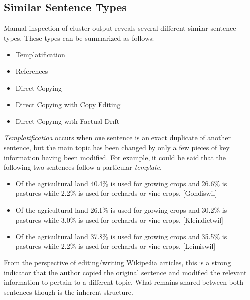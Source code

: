 \documentclass{acm_proc_article-sp}
\begin{document}
\subsection{Similar Sentence Types}

Manual inspection of cluster output reveals several different similar sentence types. These types can be summarized as follows:

\begin{itemize}
\item Templatification
\item References
\item Direct Copying
\item Direct Copying with Copy Editing
\item Direct Copying with Factual Drift
\end{itemize}

 \emph{Templatification} occurs when one sentence is an exact duplicate of another sentence, but the main topic has been changed by only a few pieces of key information having been modified. For example, it could be said that the following two sentences follow a particular \emph{template}.
\begin{itemize}[noitemsep,nolistsep]

\item Of the agricultural land 40.4\% is used for growing crops and 26.6\% is pastures while 2.2\% is used for orchards or vine crops. [Gondiswil]
\item Of the agricultural land 26.1\% is used for growing crops and 30.2\% is pastures while 3.0\% is used for orchards or vine crops. [Kleindietwil]
\item Of the agricultural land 37.8\% is used for growing crops and 35.5\% is pastures while 2.2\% is used for orchards or vine crops. [Leimiswil]

\end{itemize}
From the perspective of editing/writing Wikipedia articles, this is a strong indicator that the author copied the original sentence and modified the relevant information to pertain to a different topic. What remains shared between both sentences though is the inherent structure.
\end{document}
